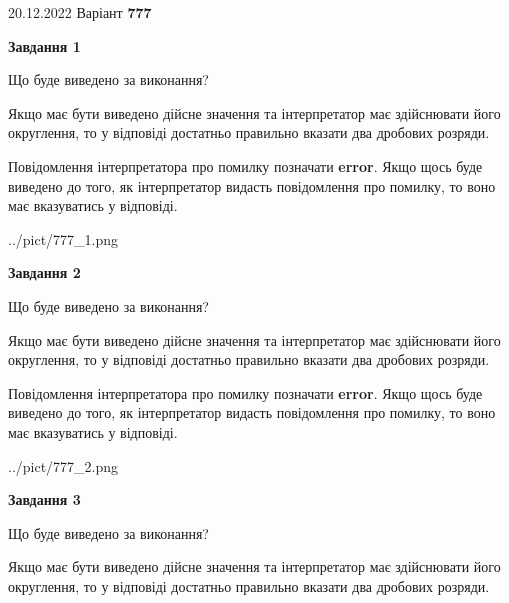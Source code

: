 \documentclass[12pt, ukrainian]{article}
\begin{document}
{20.12.2022 Варіант \No \textbf { 777 }\par}
{
\begin {Large}

{\begin {center}\textbf{Завдання 1}\end {center}}\par
Що буде виведено за виконання? \par

Якщо має бути виведено дійсне значення та інтерпретатор має здійснювати його округлення, 
то у відповіді достатньо правильно вказати два дробових розряди.

Повідомлення інтерпретатора про помилку позначати \textbf{error}.
Якщо щось буде виведено до того, як інтерпретатор видасть повідомлення про помилку, 
то воно має вказуватись у відповіді. \par

\begin{center}
	{../pict/777_1.png}
\end{center}
\newpage

{\begin {center}\textbf{Завдання 2}\end {center}}\par
Що буде виведено за виконання? \par

Якщо має бути виведено дійсне значення та інтерпретатор має здійснювати його округлення, 
то у відповіді достатньо правильно вказати два дробових розряди.

Повідомлення інтерпретатора про помилку позначати \textbf{error}.
Якщо щось буде виведено до того, як інтерпретатор видасть повідомлення про помилку, 
то воно має вказуватись у відповіді. \par

\begin{center}
	{../pict/777_2.png}
\end{center}
\newpage

{\begin {center}\textbf{Завдання 3}\end {center}}\par
Що буде виведено за виконання? \par

Якщо має бути виведено дійсне значення та інтерпретатор має здійснювати його округлення, 
то у відповіді достатньо правильно вказати два дробових розряди.


\end{Large}}
\end{document}
